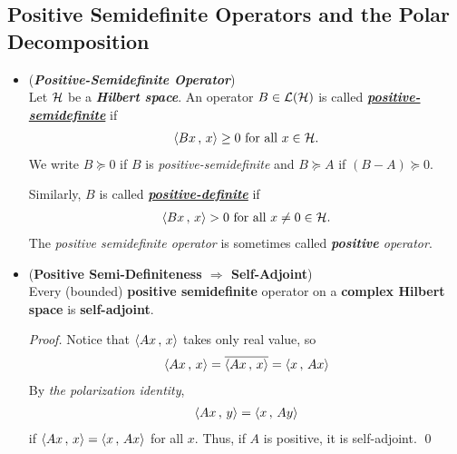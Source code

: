 \documentclass[11pt]{article}
\begin{document}
\subsection{Positive Semidefinite Operators and the Polar Decomposition}
\begin{itemize}
\item \begin{definition} (\emph{\textbf{Positive-Semidefinite Operator}})\\
Let ${\mathcal H}$ be a \emph{\textbf{Hilbert space}}. An operator $B \in {\mathcal L}({\mathcal H})$ is called \underline{\emph{\textbf{positive-semidefinite}}} if 
\begin{align*}
\left\langle Bx\,,\, x \right\rangle \ge 0\text{ for all }x \in {\mathcal H}.
\end{align*}
We write $B \succeq 0$ if $Β$ is \emph{positive-semidefinite} and  $B \succeq A$ if $(B - A) \succeq 0$. 

Similarly, $B$ is called \underline{\emph{\textbf{positive-definite}}} if 
\begin{align*}
\left\langle Bx\,,\, x \right\rangle> 0\text{ for all }x \neq 0 \in {\mathcal H}.
\end{align*} The \emph{positive semidefinite operator} is sometimes called \emph{\textbf{positive} operator}. 
\end{definition}

\item \begin{proposition} (\textbf{Positive Semi-Definiteness $\Rightarrow$ Self-Adjoint}) \citep{reed1980methods} \\
Every (bounded) \textbf{positive semidefinite} operator on a \textbf{complex Hilbert space} is \textbf{self-adjoint}. 
\end{proposition}
\begin{proof}
Notice that $\left\langle Ax\,,\, x \right\rangle$ takes only real value, so
\begin{align*}
\left\langle Ax\,,\, x \right\rangle = \overline{\left\langle Ax\,,\, x \right\rangle} = \left\langle x\,,\, Ax \right\rangle
\end{align*} By \emph{the polarization identity}, 
\begin{align*}
\left\langle Ax\,,\, y \right\rangle = \left\langle x\,,\, Ay \right\rangle
\end{align*} if $\left\langle Ax\,,\, x \right\rangle = \left\langle x\,,\, Ax \right\rangle$ for all $x$.
Thus, if $A$ is positive, it is self-adjoint. \qed 
\end{proof}


\end{itemize}
\end{document}
